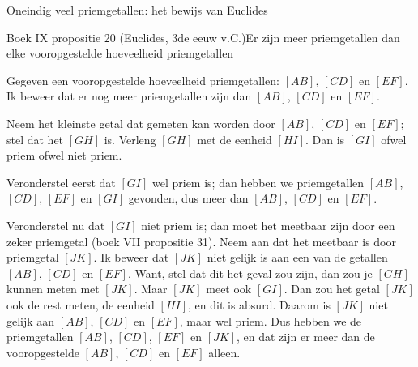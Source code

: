 \begin{lesactiviteit}{Oneindig veel priemgetallen: het bewijs van Euclides}
\begin{vraagenantwoord}[resume]


\end{vraagenantwoord}

\begin{kader}{Boek IX propositie 20 (Euclides, 3de eeuw v.C.)}{Er zijn meer priemgetallen dan elke vooropgestelde hoeveelheid priemgetallen}


Gegeven een vooropgestelde hoeveelheid priemgetallen: $[AB]$, $[CD]$ en $[EF]$. Ik beweer dat er nog meer priemgetallen zijn dan $[AB]$, $[CD]$ en $[EF]$. 

Neem het kleinste getal dat gemeten kan worden door $[AB]$, $[CD]$ en $[EF]$; stel dat het $[GH]$ is. Verleng $[GH]$ met de eenheid $[HI]$. Dan is $[GI]$ ofwel priem ofwel niet priem. 

Veronderstel eerst dat $[GI]$ wel priem is; dan hebben we priemgetallen $[AB]$, $[CD]$, $[EF]$ en $[GI]$ gevonden, dus meer dan $[AB]$, $[CD]$ en $[EF]$. 

Veronderstel nu dat $[GI]$ niet priem is; dan moet het meetbaar zijn door een zeker priemgetal (boek VII propositie 31). Neem aan dat het meetbaar is door priemgetal $[JK]$. Ik beweer dat $[JK]$ niet gelijk is aan een van de getallen $[AB]$, $[CD]$ en $[EF]$. Want, stel dat dit het geval zou zijn, dan zou je $[GH]$ kunnen meten met $[JK]$. Maar $[JK]$ meet ook $[GI]$. Dan zou het getal $[JK]$ ook de rest meten, de eenheid $[HI]$, en dit is absurd. Daarom is $[JK]$ niet gelijk aan $[AB]$, $[CD]$ en $[EF]$, maar wel priem. Dus hebben we de priemgetallen $[AB]$, $[CD]$, $[EF]$ en $[JK]$, en dat zijn er meer dan de vooropgestelde $[AB]$, $[CD]$ en $[EF]$ alleen.
\end{kader}

$ $

\end{lesactiviteit}

